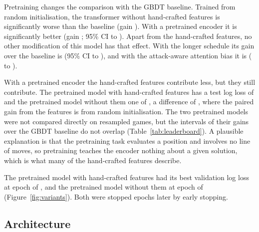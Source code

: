 \documentclass[11pt]{article}
\begin{document}
Pretraining changes the comparison with the GBDT baseline. Trained from
random initialisation, the transformer without hand-crafted features is
significantly worse than the baseline (gain
). With a pretrained encoder it is
significantly better (gain ; 95\%
CI  to
).
\ifchangeepochs
Apart from the hand-crafted features, no other modification of this model
has that effect. With the longer
schedule its gain over the baseline is 
(95\% CI  to
)\ifchangeattacks, and with the
attack-aware attention bias it is 
( to
)\fi.
\fi

With a pretrained encoder the hand-crafted features contribute less, but
they still contribute. The pretrained model with hand-crafted features has a
test log loss of  and the
pretrained model without them one of
, a difference of
, where the paired gain
from the features is 
from random initialisation. The two pretrained models were not compared
directly on resampled games, but the intervals of their gains over the GBDT
baseline do not overlap (Table~\ref{tab:leaderboard}). A plausible
explanation is that the pretraining task evaluates a position and involves no
line of moves, so pretraining teaches the encoder nothing about a given
solution, which is what many of the hand-crafted features describe.

The pretrained model with hand-crafted features had its best validation log
loss at epoch  of
, and the pretrained model
without them at epoch  of
 (Figure~\ref{fig:variants}).
Both were stopped  epochs later by early stopping.
\fi

\ifshapes
\subsection{Architecture}
\end{document}
